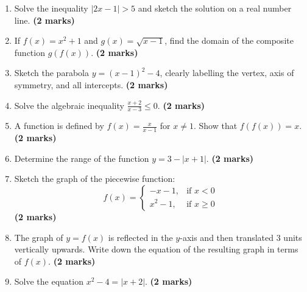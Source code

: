 \documentclass{article}
\begin{document}
\begin{enumerate}
    \item Solve the inequality $|2x - 1| > 5$ and sketch the solution on a real number line. \hfill \textbf{(2 marks)}
    \vspace{0.5cm}

    \item If $f(x) = x^2 + 1$ and $g(x) = \sqrt{x - 1}$, find the domain of the composite function $g(f(x))$. \hfill \textbf{(2 marks)}
    \vspace{0.5cm}

    \item Sketch the parabola $y = (x-1)^2 - 4$, clearly labelling the vertex, axis of symmetry, and all intercepts. \hfill \textbf{(2 marks)}
    \vspace{0.5cm}

    \item Solve the algebraic inequality $\frac{x+2}{x-3} \le 0$. \hfill \textbf{(2 marks)}
    \vspace{0.5cm}

    \item A function is defined by $f(x) = \frac{x}{x-1}$ for $x \neq 1$. Show that $f(f(x)) = x$. \hfill \textbf{(2 marks)}
    \vspace{0.5cm}

    \item Determine the range of the function $y = 3 - |x + 1|$. \hfill \textbf{(2 marks)}
    \vspace{0.5cm}

    \item Sketch the graph of the piecewise function:
    \begin{equation*}
    f(x) = \begin{cases} -x - 1, & \text{if } x < 0 \\ x^2 - 1, & \text{if } x \ge 0 \end{cases}
    \end{equation*} \hfill \textbf{(2 marks)}
    \vspace{0.5cm}

    \item The graph of $y = f(x)$ is reflected in the $y$-axis and then translated 3 units vertically upwards. Write down the equation of the resulting graph in terms of $f(x)$. \hfill \textbf{(2 marks)}
    \vspace{0.5cm}

    \item Solve the equation $x^2 - 4 = |x + 2|$. \hfill \textbf{(2 marks)}
    \vspace{0.5cm}


\end{enumerate}
\end{document}
